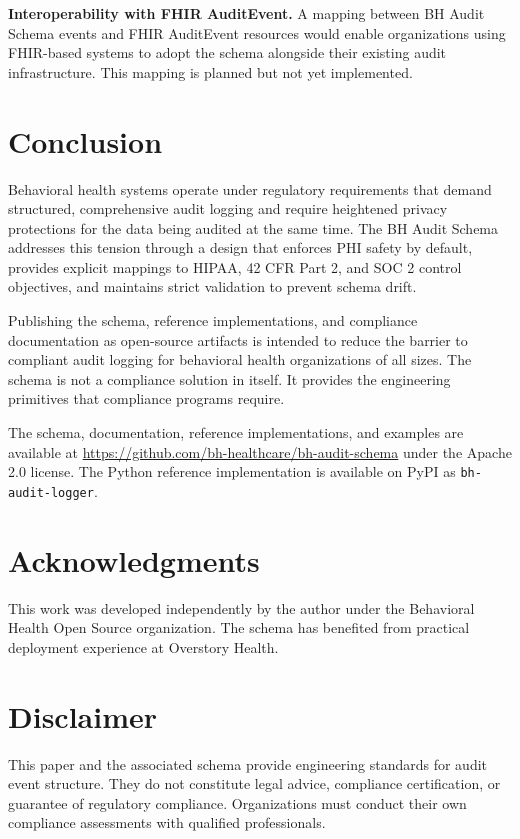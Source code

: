 \documentclass[11pt,a4paper]{article}
\begin{document}
\textbf{Interoperability with FHIR AuditEvent.} A mapping between BH Audit Schema events and FHIR AuditEvent resources would enable organizations using FHIR-based systems to adopt the schema alongside their existing audit infrastructure. This mapping is planned but not yet implemented.

\section{Conclusion}

Behavioral health systems operate under regulatory requirements that demand structured, comprehensive audit logging and require heightened privacy protections for the data being audited at the same time. The BH Audit Schema addresses this tension through a design that enforces PHI safety by default, provides explicit mappings to HIPAA, 42 CFR Part 2, and SOC 2 control objectives, and maintains strict validation to prevent schema drift.

Publishing the schema, reference implementations, and compliance documentation as open-source artifacts is intended to reduce the barrier to compliant audit logging for behavioral health organizations of all sizes. The schema is not a compliance solution in itself. It provides the engineering primitives that compliance programs require.

The schema, documentation, reference implementations, and examples are available at \url{https://github.com/bh-healthcare/bh-audit-schema} under the Apache 2.0 license. The Python reference implementation is available on PyPI as \texttt{bh-audit-logger}.

\section*{Acknowledgments}

This work was developed independently by the author under the Behavioral Health Open Source organization. The schema has benefited from practical deployment experience at Overstory Health.

\section*{Disclaimer}

This paper and the associated schema provide engineering standards for audit event structure. They do not constitute legal advice, compliance certification, or guarantee of regulatory compliance. Organizations must conduct their own compliance assessments with qualified professionals.
\end{document}
